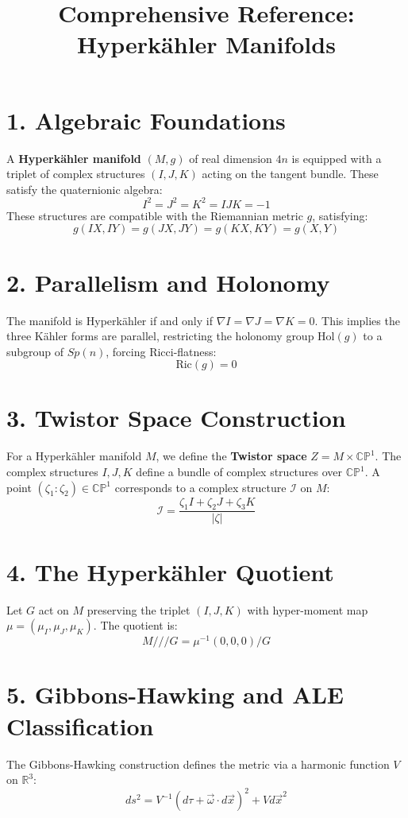 \documentclass{article}
\title{Comprehensive Reference: Hyperkähler Manifolds}
\author{}
\date{}
\begin{document}
\maketitle

\section{1. Algebraic Foundations}
A \textbf{Hyperkähler manifold} $(M, g)$ of real dimension $4n$ is equipped with a triplet of complex structures $(I, J, K)$ acting on the tangent bundle. These satisfy the quaternionic algebra:
\[ I^2 = J^2 = K^2 = IJK = -1 \]
These structures are compatible with the Riemannian metric $g$, satisfying:
\[ g(IX, IY) = g(JX, JY) = g(KX, KY) = g(X, Y) \]

\section{2. Parallelism and Holonomy}
The manifold is Hyperkähler if and only if $\nabla I = \nabla J = \nabla K = 0$. This implies the three Kähler forms are parallel, restricting the holonomy group $\text{Hol}(g)$ to a subgroup of $Sp(n)$, forcing Ricci-flatness:
\[ \text{Ric}(g) = 0 \]

\section{3. Twistor Space Construction}
For a Hyperkähler manifold $M$, we define the \textbf{Twistor space} $Z = M \times \mathbb{CP}^1$. The complex structures $I, J, K$ define a bundle of complex structures over $\mathbb{CP}^1$. A point $(\zeta_1 : \zeta_2) \in \mathbb{CP}^1$ corresponds to a complex structure $\mathcal{I}$ on $M$:
\[ \mathcal{I} = \frac{\zeta_1 I + \zeta_2 J + \zeta_3 K}{|\zeta|} \]


\section{4. The Hyperkähler Quotient}
Let $G$ act on $M$ preserving the triplet $(I, J, K)$ with hyper-moment map $\mu = (\mu_I, \mu_J, \mu_K)$. The quotient is:
\[ M /// G = \mu^{-1}(0, 0, 0) / G \]

\section{5. Gibbons-Hawking and ALE Classification}
The Gibbons-Hawking construction defines the metric via a harmonic function $V$ on $\mathbb{R}^3$:
\[ ds^2 = V^{-1}(d\tau + \vec{\omega} \cdot d\vec{x})^2 + V d\vec{x}^2 \]
\end{document}
